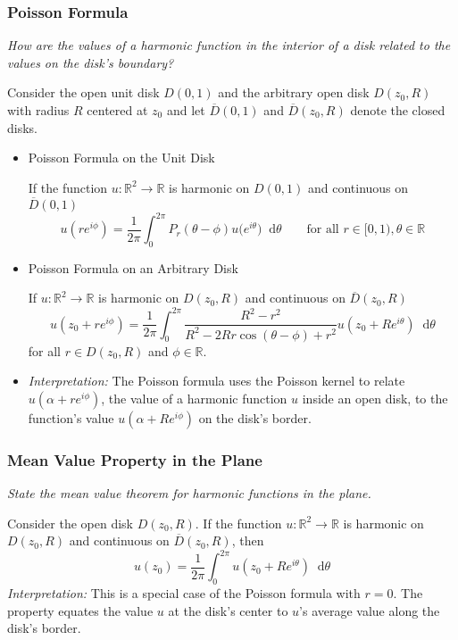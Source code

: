\documentclass[11pt, a4paper]{article}
\newcommand{\question}[1]{\textit{#1}\vspace{2mm}}
\newcommand{\R}{\mathbb{R}} %
\newcommand{\diff}{\mathop{}\!\mathrm{d}} %
\begin{document}
\subsubsection{Poisson Formula}
\question{How are the values of a harmonic function in the interior of a disk related to the values on the disk's boundary?}

Consider the open unit disk $ D(0, 1) $ and the arbitrary open disk $ D(z_{0}, R) $ with radius $ R $ centered at $ z_{0} $ and let $ \overline{D}(0,1) $ and $ \overline{D}(z_{0}, R) $ denote the closed disks.
\begin{itemize}
	\item Poisson Formula on the Unit Disk
	
	If the function $ u : \R^{2} \to \R $ is harmonic on $ D(0, 1) $ and continuous on $ \overline{D}(0, 1) $
	\begin{equation*}
		u(re^{i\phi}) = \frac{1}{2\pi} \int_{0}^{2\pi} P_r(\theta - \phi) u \big(e^{i\theta} \big)\diff \theta \qquad \text{for all }  r\in[0, 1), \theta \in \R 
	\end{equation*} 

	
	\item Poisson Formula on an Arbitrary Disk
	
	If $ u: \R^{2} \to \R $ is harmonic on $ D(z_{0}, R) $ and continuous on $ \overline{D}(z_{0}, R) $
	\begin{equation*}
		u(z_{0} + re^{i\phi}) = \frac{1}{2\pi} \int_{0}^{2\pi} \frac{R^2 - r^2}{R^2 - 2 Rr \cos(\theta - \phi) + r^2} u(z_{0} + Re^{i\theta}) \diff \theta
	\end{equation*}
	for all $ r \in D(z_{0}, R) $ and $ \phi \in \R $.
	
	\item \textit{Interpretation:} The Poisson formula uses the Poisson kernel to relate $ u(\alpha + re^{i\phi}) $, the value of a harmonic function $ u $ inside an open disk, to the function's value $ u(\alpha + Re^{i\phi}) $ on the disk's border.
\end{itemize}


\subsubsection{Mean Value Property in the Plane}
\question{State the mean value theorem for harmonic functions in the plane.}

Consider the open disk $ D(z_{0}, R) $. If the function $ u :\R^{2} \to \R$ is harmonic on $ D(z_{0}, R) $ and continuous on $ \overline{D}(z_{0}, R) $, then
\begin{equation*}
	u(z_{0}) = \frac{1}{2\pi}\int_{0}^{2\pi}u(z_{0} + Re^{i\theta}) \diff \theta
\end{equation*}
\textit{Interpretation:} This is a special case of the Poisson formula with $ r = 0 $. The property equates the value $ u $ at the disk's center to $ u $'s average value along the disk's border.
\end{document}
